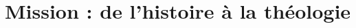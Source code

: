 \documentclass[oneside,10pt]{book}
\begin{document}
 







\setcounter{page}{1}
 



%
%

% 
%
%
%

%
%

% 
 
 
  
 
 
 
 \part{Mission : de l'histoire à la théologie}
 
 

 
 
 
 
 
 
   


%

%
\end{document}
